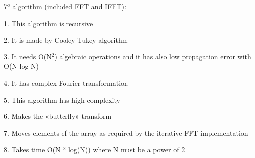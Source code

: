 \documentclass[12pt,a4paper,openany]{article}
\begin{document}
7º algorithm (included FFT and IFFT):


1.	This algorithm is recursive


2.	It is made by Cooley-Tukey algorithm


3.	It needs O(N$^{2}$) algebraic operations and it has also low propagation error with O(N log N)


4.	It has complex Fourier transformation


5.	This algorithm has high complexity


6.	Makes the «butterfly» transform


7.	Moves elements of the array as required by the iterative FFT implementation


8.	Takes time O(N * log(N)) where N must be a power of 2


\end{document}
